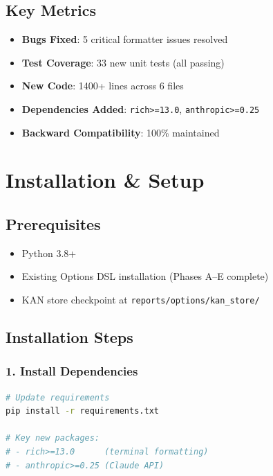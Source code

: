 \documentclass[12pt,oneside,openany]{book}
\begin{document}
\section{Key Metrics}

\begin{itemize}
    \item \textbf{Bugs Fixed}: 5 critical formatter issues resolved
    \item \textbf{Test Coverage}: 33 new unit tests (all passing)
    \item \textbf{New Code}: 1400+ lines across 6 files
    \item \textbf{Dependencies Added}: \texttt{rich>=13.0}, \texttt{anthropic>=0.25}
    \item \textbf{Backward Compatibility}: 100\% maintained
\end{itemize}

\chapter{Installation \& Setup}

\section{Prerequisites}

\begin{itemize}
    \item Python 3.8+
    \item Existing Options DSL installation (Phases A--E complete)
    \item KAN store checkpoint at \texttt{reports/options/kan\_store/}
\end{itemize}

\section{Installation Steps}

\subsection{1. Install Dependencies}

\begin{lstlisting}[language=bash]
# Update requirements
pip install -r requirements.txt

# Key new packages:
# - rich>=13.0      (terminal formatting)
# - anthropic>=0.25 (Claude API)
\end{lstlisting}
\end{document}
